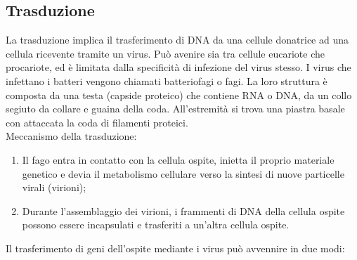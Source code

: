 \subsection{Trasduzione}
La trasduzione implica il trasferimento di DNA da una cellule donatrice ad una cellula ricevente tramite un virus. Può avenire sia tra cellule eucariote che procariote, ed è limitata dalla specificità di infezione del virus stesso. I virus che infettano i batteri vengono chiamati batteriofagi o fagi. La loro struttura è composta da una testa (capside proteico) che contiene RNA o DNA, da un collo segiuto da collare e guaina della coda. All'estremità si trova una piastra basale con attaccata la coda di filamenti proteici. 
\\Meccanismo della trasduzione:
\begin{enumerate}
    \item Il fago entra in contatto con la cellula ospite, inietta il proprio materiale genetico e devia il metabolismo cellulare verso la sintesi di nuove particelle virali (virioni); 
    \item Durante l'assemblaggio dei virioni, i frammenti di DNA della cellula ospite possono essere incapsulati e trasferiti a un'altra cellula ospite.
\end{enumerate}
Il trasferimento di geni dell'ospite mediante i virus può avvennire in due modi: 
